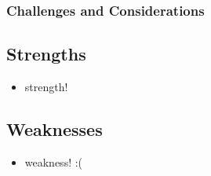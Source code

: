 \subsubsection{Challenges and Considerations}
\label{subsec:hilla:challenges}

\subsection{Strengths}
\label{subsec:svelte:strengths}
\begin{itemize}
    \item strength! 
\end{itemize}

\subsection{Weaknesses}
\label{subsec:svelte:weaknesses}
\begin{itemize}
    \item weakness! :( 
\end{itemize}